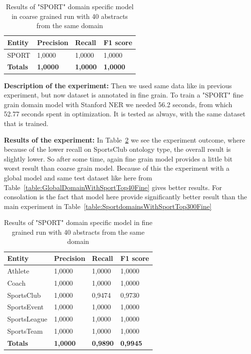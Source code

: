 \documentclass[thesis=M,english]{FITthesis}[2018/05/30]
\begin{document}
	\begin{table}[H]\centering
		\begin{tabular}{|l|l|l|l|}
			\hline {\textbf{Entity}} & {\textbf{Precision}} & {\textbf{Recall}} & {\textbf{F1 score}}\\\hline
				SPORT & 1,0000 & 1,0000 & 1,0000\\\hline
				\textbf{Totals} & \textbf{1,0000} & \textbf{1,0000} & \textbf{1,0000}\\\hline
		\end{tabular}
		\caption{Results of "SPORT" domain specific model in coarse grained run with 40 abstracts from the same domain \label{table:SportDomainWithSportTop40Coarse}}
	\end{table}


	\textbf{Description of the experiment:} Then we used same data like in previous experiment, but now dataset is annotated in fine grain. To train a "SPORT" fine grain domain model with Stanford NER we needed 56.2 seconds, from which 52.77 seconds spent in optimization. It is tested as always, with the same dataset that is trained.

	\textbf{Results of the experiment:} In Table~\ref{table:SportDomainWithSportTop40Fine} we see the experiment outcome, where because of the lower recall on SportsClub ontology type, the overall result is slightly lower. So after some time, again fine grain model provides a little bit worst result than coarse grain model. Because of this the experiment with a global model and same test dataset like here from Table~\ref{table:GlobalDomainWithSportTop40Fine} gives better results. For consolation is the fact that model here provide significantly better result than the main experiment in Table~\ref{table:SportdomainsWithSportTop300Fine}

	\begin{table}[H]\centering
		\begin{tabular}{|l|l|l|l|}
			\hline {\textbf{Entity}} & {\textbf{Precision}} & {\textbf{Recall}} & {\textbf{F1 score}}\\\hline
				Athlete & 1,0000 & 1,0000 & 1,0000\\
				Coach & 1,0000 & 1,0000 & 1,0000\\
				SportsClub & 1,0000 & 0,9474 & 0,9730\\
				SportsEvent & 1,0000 & 1,0000 & 1,0000\\
				SportsLeague & 1,0000 & 1,0000 & 1,0000\\
				SportsTeam & 1,0000 & 1,0000 & 1,0000\\\hline
				\textbf{Totals} & \textbf{1,0000} & \textbf{0,9890} & \textbf{0,9945}\\\hline
		\end{tabular}
		\caption{Results of "SPORT" domain specific model in fine grained run with 40 abstracts from the same domain \label{table:SportDomainWithSportTop40Fine}}
	\end{table}	
\end{document}
